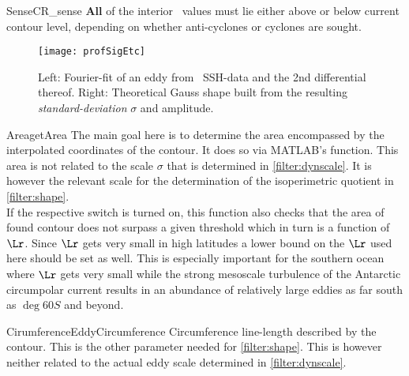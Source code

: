 \begin{filter}{Sense}{CR_sense}
\textbf{All} of the interior \SSH~values must lie either above or below current
contour level, depending on whether anti-cyclones or cyclones are sought.
\end{filter}\newline
\begin{figure}
	\texttt{[image: profSigEtc]}
	\caption{Left: Fourier-fit of an eddy from \POP~SSH-data and the 2nd differential thereof. Right: Theoretical Gauss shape built from the resulting \textit{standard-deviation} \ie $\sigma$ and amplitude.}
	\label{fig:profSigEtc}
\end{figure}
\begin{filter}{Area}{getArea}
\label{filter:area}
The main goal here is to determine the area encompassed by the interpolated coordinates of the contour. It does so via MATLAB's  function. This area is not related to the scale $\sigma$ that is determined in \cref{filter:dynscale}. It is however the relevant scale for the determination of the isoperimetric quotient in \cref{filter:shape}.\\
If the respective switch is turned on, this function also checks that the area of found contour does not surpass a given threshold which in turn is a function of $\Lr$. Since $\Lr$ gets very small in high latitudes a lower bound on the $\Lr$ used here should be set as well. This is especially important for the southern ocean where $\Lr$ gets very small while the strong mesoscale turbulence of the Antarctic circumpolar current results in an abundance of relatively large eddies as far south as $\deg{60} S$ and beyond.
\end{filter}\newline
\begin{filter}{Cirumference}{EddyCircumference}
Circumference \eg line-length described by the contour. This is the other parameter needed for \cref{filter:shape}. This is however neither related to the actual eddy scale determined in
\cref{filter:dynscale}.
\end{filter}\newline
